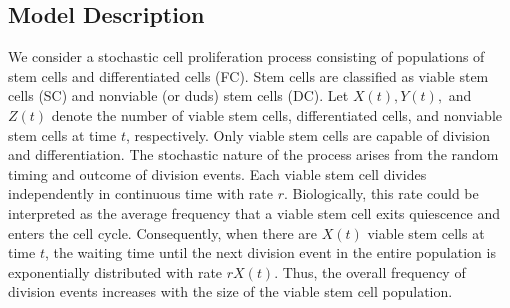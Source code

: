 \documentclass[pdflatex,sn-mathphys-num]{sn-jnl}
\theoremstyle{thmstyleone}%
\theoremstyle{thmstyletwo}%
\theoremstyle{thmstylethree}%
\begin{document}
\subsection{Model Description}
We consider a stochastic cell proliferation process consisting of populations of stem cells and differentiated cells (FC). Stem cells are classified as viable stem cells (SC) and nonviable (or duds) stem cells (DC). Let $X(t), Y(t),$ and $Z(t)$ denote the number of viable stem cells, differentiated cells, and nonviable stem cells at time $t$, respectively. Only viable stem cells are capable of division and differentiation. The stochastic nature of the process arises from the random timing and outcome of division events. Each viable stem cell divides independently in continuous time with rate $r$. Biologically, this rate could be interpreted as the average frequency that a viable stem cell exits quiescence and enters the cell cycle. Consequently, when there are $X(t)$ viable stem cells at time $t$, the waiting time until the next division event in the entire population is exponentially distributed with rate $rX(t)$. Thus, the overall frequency of division events increases with the size of the viable stem cell population.
\end{document}

